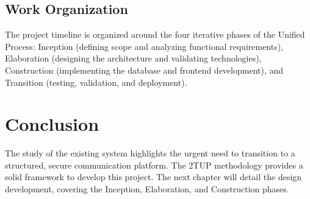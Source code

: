 \subsection{Work Organization}
The project timeline is organized around the four iterative phases of the Unified Process: Inception (defining scope and analyzing functional requirements), Elaboration (designing the architecture and validating technologies), Construction (implementing the database and frontend development), and Transition (testing, validation, and deployment).

\section{Conclusion}
The study of the existing system highlights the urgent need to transition to a structured, secure communication platform. The 2TUP methodology provides a solid framework to develop this project. The next chapter will detail the design development, covering the Inception, Elaboration, and Construction phases.
